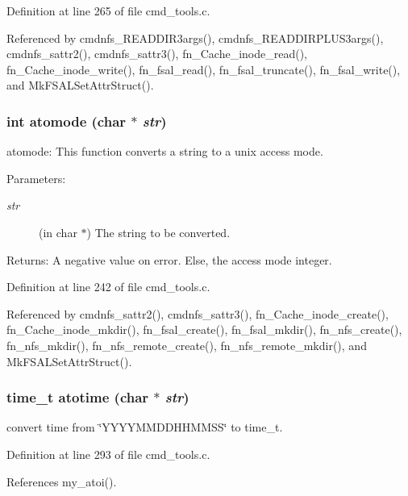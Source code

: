 Definition at line 265 of file cmd\_\-tools.c.

Referenced by cmdnfs\_\-READDIR3args(), cmdnfs\_\-READDIRPLUS3args(), cmdnfs\_\-sattr2(), cmdnfs\_\-sattr3(), fn\_\-Cache\_\-inode\_\-read(), fn\_\-Cache\_\-inode\_\-write(), fn\_\-fsal\_\-read(), fn\_\-fsal\_\-truncate(), fn\_\-fsal\_\-write(), and Mk\-FSALSet\-Attr\-Struct().
\subsubsection{\setlength{\rightskip}{0pt plus 5cm}int atomode (char $\ast$ {\em str})}\label{cmd__tools_8h_a11}


atomode: This function converts a string to a unix access mode.

\begin{Desc}
\item[Parameters:]
\begin{description}
\item[{\em str}](in char $\ast$) The string to be converted.\end{description}
\end{Desc}
\begin{Desc}
\item[Returns:]A negative value on error. Else, the access mode integer. \end{Desc}


Definition at line 242 of file cmd\_\-tools.c.

Referenced by cmdnfs\_\-sattr2(), cmdnfs\_\-sattr3(), fn\_\-Cache\_\-inode\_\-create(), fn\_\-Cache\_\-inode\_\-mkdir(), fn\_\-fsal\_\-create(), fn\_\-fsal\_\-mkdir(), fn\_\-nfs\_\-create(), fn\_\-nfs\_\-mkdir(), fn\_\-nfs\_\-remote\_\-create(), fn\_\-nfs\_\-remote\_\-mkdir(), and Mk\-FSALSet\-Attr\-Struct().
\subsubsection{\setlength{\rightskip}{0pt plus 5cm}time\_\-t atotime (char $\ast$ {\em str})}\label{cmd__tools_8h_a13}


convert time from \char`\"{}YYYYMMDDHHMMSS\char`\"{} to time\_\-t. 

Definition at line 293 of file cmd\_\-tools.c.

References my\_\-atoi().

